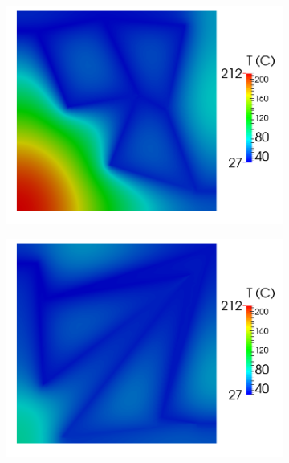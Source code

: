 \documentclass[11pt,letterpaper]{article}
\begin{document}
\begin{figure}[!h]
\begin{subfigure}{0.4\textwidth}
\includegraphics[width=\linewidth]{parallel2x2_T_0.png}
\caption{}
\end{subfigure}
\begin{subfigure}{0.4\textwidth}
\includegraphics[width=\linewidth]{parallel2x2_T_23.png}
\caption{}
\end{subfigure}


\end{figure}
\end{document}
